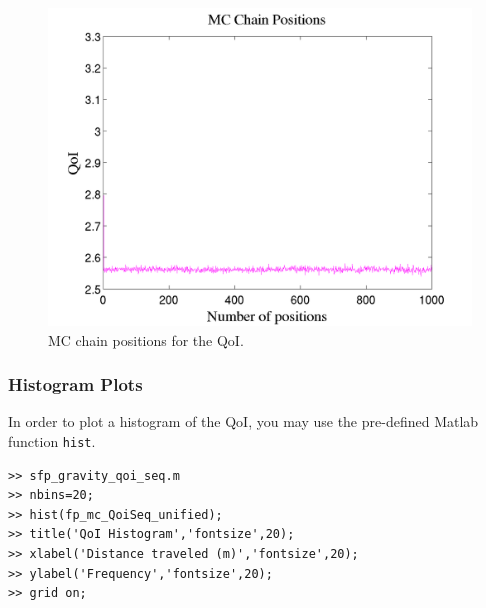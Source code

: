 \begin{figure}[htb]
\centering 
\includegraphics[scale=0.40]{rawfigs/sfp_gravity_chain_pos.png}
\vspace*{-10pt}
\caption{MC chain positions for the QoI.}
\label{fig:sfp_gravity_chain}
\end{figure}

\subsubsection{Histogram Plots}

In order to plot a histogram of the QoI, you may use the pre-defined Matlab function \verb+hist+.
%
\begin{lstlisting}[label=matlab:hist_qoi,caption={Matlab code for the QoI histogram plot.}]
>> sfp_gravity_qoi_seq.m
>> nbins=20;
>> hist(fp_mc_QoiSeq_unified);
>> title('QoI Histogram','fontsize',20);
>> xlabel('Distance traveled (m)','fontsize',20);
>> ylabel('Frequency','fontsize',20);
>> grid on;
\end{lstlisting}

